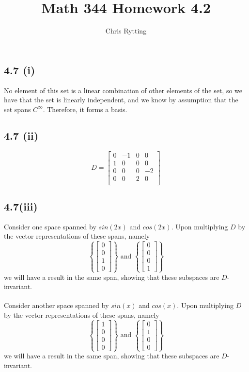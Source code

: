 \documentclass[letterpaper,12pt]{article}
\theoremstyle{definition}
\begin{document}
\title{Math 344 Homework 4.2}
\author{Chris Rytting}
\maketitle

\subsection*{4.7 (i)}
No element of this set is a linear combination of other elements of the set, so we have that the set is linearly independent, and we know by assumption that the set spans $C^{\infty}$. Therefore, it forms a basis.

\subsection*{4.7 (ii)}
\[
D = 
\begin{bmatrix}
    0 & -1 & 0 & 0 \\
    1 & 0 & 0 & 0 \\
    0 & 0 & 0 & -2 \\
    0 & 0 & 2 & 0 \\
\end{bmatrix}
\]

\subsection*{4.7(iii)}

Consider one space spanned by $sin(2x)$ and $cos(2x)$. Upon multiplying $D$ by the vector representations of these spans, namely
\[ \left\{ 
\begin{bmatrix}
    0\\0\\1\\0
\end{bmatrix}\right\}
\text{ and }
\left\{ 
\begin{bmatrix}
    0\\0\\0\\1
\end{bmatrix}\right\}\]
we will have a result in the same span, showing that these subspaces are $D$-invariant.\\\\


Consider another space spanned by $sin(x)$ and $cos(x)$. Upon multiplying $D$ by the vector representations of these spans, namely
\[ \left\{ 
\begin{bmatrix}
    1\\0\\0\\0
\end{bmatrix}\right\}
\text{ and }
\left\{ 
\begin{bmatrix}
    0\\1\\0\\0
\end{bmatrix}\right\}\]
we will have a result in the same span, showing that these subspaces are $D$-invariant.
\end{document}
